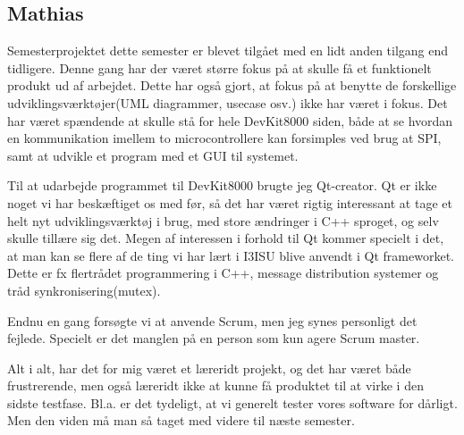 \subsection{Mathias}
Semesterprojektet dette semester er blevet tilgået med en lidt anden tilgang end tidligere. Denne gang har der været større fokus på at skulle få et funktionelt produkt ud af arbejdet. Dette har også gjort, at fokus på at benytte de forskellige udviklingsværktøjer(UML diagrammer, usecase osv.) ikke har været i fokus. Det har været spændende at skulle stå for hele DevKit8000 siden, både at se hvordan en kommunikation imellem to microcontrollere kan forsimples ved brug at SPI, samt at udvikle et program med et GUI til systemet.

Til at udarbejde programmet til DevKit8000 brugte jeg Qt-creator. Qt er ikke noget vi har beskæftiget os med før, så det har været rigtig interessant at tage et helt nyt udviklingsværktøj i brug, med store ændringer i C++ sproget, og selv skulle tillære sig det. Megen af interessen i forhold til Qt kommer specielt i det, at man kan se flere af de ting vi har lært i I3ISU blive anvendt i Qt frameworket. Dette er fx flertrådet programmering i C++, message distribution systemer og tråd synkronisering(mutex). 

Endnu en gang forsøgte vi at anvende Scrum, men jeg synes personligt det fejlede. Specielt er det manglen på en person som kun agere Scrum master.

Alt i alt, har det for mig været et læreridt projekt, og det har været både frustrerende, men også læreridt ikke at kunne få produktet til at virke i den sidste testfase. Bl.a. er det tydeligt, at vi generelt tester vores software for dårligt. Men den viden må man så taget med videre til næste semester.

